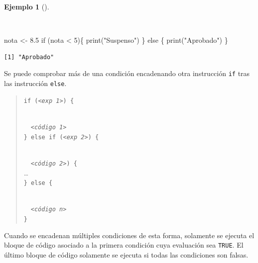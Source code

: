 \documentclass[
  a4paper,
]{scrreport}
\newenvironment{Shaded}{\begin{snugshade}}{\end{snugshade}}
\newcommand{\ControlFlowTok}[1]{\textcolor[rgb]{0.00,0.23,0.31}{#1}}
\newcommand{\DecValTok}[1]{\textcolor[rgb]{0.68,0.00,0.00}{#1}}
\newcommand{\FloatTok}[1]{\textcolor[rgb]{0.68,0.00,0.00}{#1}}
\newcommand{\FunctionTok}[1]{\textcolor[rgb]{0.28,0.35,0.67}{#1}}
\newcommand{\NormalTok}[1]{\textcolor[rgb]{0.00,0.23,0.31}{#1}}
\newcommand{\OtherTok}[1]{\textcolor[rgb]{0.00,0.23,0.31}{#1}}
\newcommand{\SpecialCharTok}[1]{\textcolor[rgb]{0.37,0.37,0.37}{#1}}
\newcommand{\StringTok}[1]{\textcolor[rgb]{0.13,0.47,0.30}{#1}}
\theoremstyle{definition}
\theoremstyle{definition}
\newtheorem{example}{Ejemplo}[chapter]
\theoremstyle{remark}
\begin{document}
\begin{example}[]\protect\hypertarget{exm-condicional-doble}{}\label{exm-condicional-doble}

~

\begin{Shaded}
\begin{Highlighting}[]
\NormalTok{nota }\OtherTok{\textless{}{-}} \FloatTok{8.5}
\ControlFlowTok{if}\NormalTok{ (nota }\SpecialCharTok{\textless{}} \DecValTok{5}\NormalTok{)\{}
  \FunctionTok{print}\NormalTok{(}\StringTok{"Suspenso"}\NormalTok{)}
\NormalTok{\} }\ControlFlowTok{else}\NormalTok{ \{}
  \FunctionTok{print}\NormalTok{(}\StringTok{"Aprobado"}\NormalTok{)}
\NormalTok{\}}
\end{Highlighting}
\end{Shaded}

\begin{verbatim}
[1] "Aprobado"
\end{verbatim}

\end{example}

Se puede comprobar más de una condición encadenando otra instrucción
\texttt{if} tras las instrucción \texttt{else}.

\begin{quote}
\texttt{if\ (}\emph{\texttt{\textless{}exp\ 1\textgreater{}}}\texttt{)\ \{}\strut \\
  \emph{\texttt{\textless{}código\ 1\textgreater{}}}\\
\texttt{\}\ else\ if\ (}\emph{\texttt{\textless{}exp\ 2\textgreater{}}}\texttt{)\ \{}\strut \\
  \emph{\texttt{\textless{}código\ 2\textgreater{}}}\texttt{)\ \{}\\
\ldots{}\\
\texttt{\}\ else\ \{}\strut \\
  \emph{\texttt{\textless{}código\ n\textgreater{}}}\\
\texttt{\}}
\end{quote}

Cuando se encadenan múltiples condiciones de esta forma, solamente se
ejecuta el bloque de código asociado a la primera condición cuya
evaluación sea \texttt{TRUE}. El último bloque de código solamente se
ejecuta si todas las condiciones son falsas.
\end{document}
